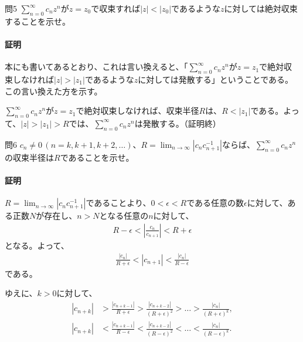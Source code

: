 \begin{mysimplebox}{問5}
    $\sum_{n=0}^\infty c_nz^n$が$z=z_0$で収束すれば$|z|<|z_0|$であるような$z$に対しては絶対収束することを示せ。
\end{mysimplebox}
\paragraph{証明}
本にも書いてあるとおり、これは言い換えると、「$\sum_{n=0}^\infty c_nz^n$が$z=z_1$で絶対収束しなければ$|z|>|z_1|$であるような$z$に対しては発散する」ということである。この言い換えた方を示す。

$\sum_{n=0}^\infty c_nz^n$が$z=z_1$で絶対収束しなければ、収束半径$R$は、$R<|z_1|$である。よって、$|z|>|z_1|>R$では、$\sum_{n=0}^\infty c_nz^n$は発散する。（証明終）

\begin{mysimplebox}{問6}
    $c_n\neq 0\,(n=k, k+1, k+2,\dots)$、$R=\lim_{n\to\infty}|c_nc_{n+1}^{-1}|$ならば、$\sum_{n=0}^\infty c_nz^n$の収束半径は$R$であることを示せ。
\end{mysimplebox}
\paragraph{証明}
$R=\lim_{n\to\infty}|c_nc_{n+1}^{-1}|$であることより、$0<\epsilon<R$である任意の数$\epsilon$に対して、ある正数$N$が存在し、$n>N$となる任意の$n$に対して、
\begin{align*}
    R-\epsilon<\left|\frac{c_n}{c_{n+1}}\right|<R+\epsilon
\end{align*}
となる。よって、
\begin{align*}
    \frac{|c_n|}{R+\epsilon}<|c_{n+1}|<\frac{|c_n|}{R-\epsilon}
\end{align*}    
である。

ゆえに、$k>0$に対して、
\begin{align}
    |c_{n+k}|&>\frac{|c_{n+k-1}|}{R+\epsilon}>\frac{|c_{n+k-2}|}{(R+\epsilon)^2}>\dots>\frac{|c_{n}|}{(R+\epsilon)^k},\label{eq:convR1}\\
    |c_{n+k}|&<\frac{|c_{n+k-1}|}{R-\epsilon}<\frac{|c_{n+k-2}|}{(R-\epsilon)^2}<\dots<\frac{|c_{n}|}{(R-\epsilon)^k}.\label{eq:convR2}
\end{align}

